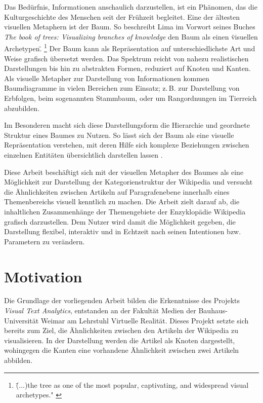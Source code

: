 
Das Bedürfnis, Informationen anschaulich darzustellen, ist ein Phänomen, das die Kulturgeschichte des Menschen seit der Frühzeit begleitet.
Eine der ältesten visuellen Metaphern ist der Baum.
So beschreibt Lima \cite[S. 9]{lima2014book} im Vorwort seines Buches \emph{The book of trees: Visualizing branches of knowledge} den Baum als einen \" visuellen Archetypen\" . \footnote{ \"(...)the tree as one of the most popular, captivating, and widespread visual archetypes." \cite[S. 9]{lima2014book}}
Der Baum kann als Repräsentation auf unterschiedlichste Art und Weise grafisch übersetzt werden.
Das Spektrum reicht von nahezu realistischen Darstellungen bis hin zu abstrakten Formen, reduziert auf Knoten und Kanten.
Als visuelle Metapher zur Darstellung von Informationen kommen Baumdiagramme in vielen Bereichen zum Einsatz; z.\,B. zur Darstellung von Erbfolgen, beim sogenannten Stammbaum, oder um Rangordnungen im Tierreich abzubilden. \cite{lima2014book}

Im Besonderen macht sich diese Darstellungsform die Hierarchie und geordnete Struktur eines Baumes zu Nutzen.
So lässt sich der Baum als eine visuelle Repräsentation verstehen, mit deren Hilfe sich komplexe Beziehungen zwischen einzelnen Entitäten übersichtlich darstellen lassen \cite[S. 43]{lima2014book}.

Diese Arbeit beschäftigt sich mit der visuellen Metapher des Baumes als eine Möglichkeit zur Darstellung der Kategorienstruktur der Wikipedia und versucht die Ähnlichkeiten zwischen Artikeln auf Paragrafenebene innerhalb eines Themenbereichs visuell kenntlich zu machen.
Die Arbeit zielt darauf ab, die inhaltlichen Zusammenhänge der Themengebiete der Enzyklopädie Wikipedia grafisch darzustellen.
Dem Nutzer wird damit die Möglichkeit gegeben, die Darstellung flexibel, interaktiv und in Echtzeit nach seinen Intentionen bzw. Parametern zu verändern.

\section{Motivation}\label{subchap:motivation}
Die Grundlage der vorliegenden Arbeit bilden die Erkenntnisse des Projekts \emph{Visual Text Analytics}, entstanden an der Fakultät Medien der Bauhaus-Universität Weimar am Lehrstuhl Virtuelle Realität.
Dieses Projekt setzte sich bereits zum Ziel, die Ähnlichkeiten zwischen den Artikeln der Wikipedia zu visualisieren.
In der Darstellung werden die Artikel als Knoten dargestellt, wohingegen die Kanten eine vorhandene Ähnlichkeit zwischen zwei Artikeln abbilden.

